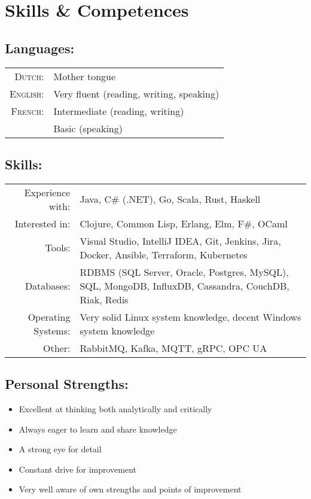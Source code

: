 \documentclass[a4paper,10pt]{article}
\begin{document}
\section{\textcolor{awesome-red}{Ski}lls \& Competences}

\subsection{Languages:}
\begin{tabular}{rl}
\textsc{Dutch:}&Mother tongue\\
\textsc{English:}&Very fluent (reading, writing, speaking)\\
\textsc{French:}&Intermediate (reading, writing) \\ & Basic (speaking)\\
\end{tabular}

\subsection{Skills:}
\begin{tabular}{rp{11cm}}
Experience with:& Java, C\# (.NET), Go, Scala, Rust, Haskell\\
Interested in:& Clojure, Common Lisp, Erlang, Elm, F\#, OCaml\\
Tools:& Visual Studio, IntelliJ IDEA, Git, Jenkins, Jira, Docker, Ansible, Terraform, Kubernetes\\
Databases:& RDBMS (SQL Server, Oracle, Postgres, MySQL), SQL, MongoDB, InfluxDB, Cassandra, CouchDB, Riak, Redis\\
Operating Systems:& Very solid Linux system knowledge, decent Windows system knowledge\\
Other:& RabbitMQ, Kafka, MQTT, gRPC, OPC UA
\end{tabular}

\subsection{Personal Strengths:}
\begin{itemize}
\item Excellent at thinking both analytically and critically
\item Always eager to learn and share knowledge
\item A strong eye for detail
\item Constant drive for improvement
\item Very well aware of own strengths and points of improvement
\end{itemize}
\end{document}
